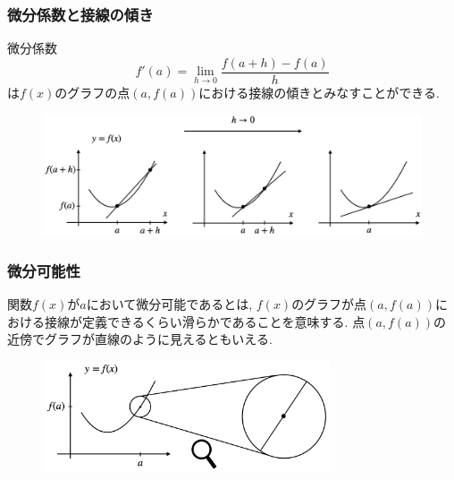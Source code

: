 \begin{frame}
\frametitle{微分係数と接線の傾き}

微分係数
$$
f'(a)=
\lim_{h\to 0} \frac{f(a+h)-f(a)}{h}
$$
は$f(x)$のグラフの点$(a,f(a))$における接線の傾きとみなすことができる. 
 

 \begin{figure}[htbp]
 \begin{center} 
  \includegraphics[width=120mm]{calculus4/tangent.png}
 \end{center}
\end{figure}


\end{frame}


\begin{frame}
\frametitle{微分可能性}

関数$f(x)$が$a$において微分可能であるとは, $f(x)$のグラフが点$(a,f(a))$における接線が定義できるくらい滑らかであることを意味する. 
点$(a,f(a))$の近傍でグラフが直線のように見えるともいえる.  


 \begin{figure}[htbp]
 \begin{center} 
  \includegraphics[width=85mm]{calculus4/differentiable2.png}
 \end{center}
\end{figure}

\end{frame}




